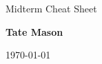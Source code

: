 \documentclass[3pt, a4paper]{article}
\newcommand\Information{Tate Mason}                        %
\begin{document}
  \begin{titlepage}
    \begin{center}
      \vspace*{3cm}
            
        \vspace{1cm}
        \huge
        Midterm Cheat Sheet
            
        \vspace{1.5cm}
        \Large
            
        \textbf{\Information}                      %
            
        \vfill
            
        \vspace{1cm}
        \Large
        
        \today
            
    \end{center}
  \end{titlepage}

  \newpage
\end{document}
